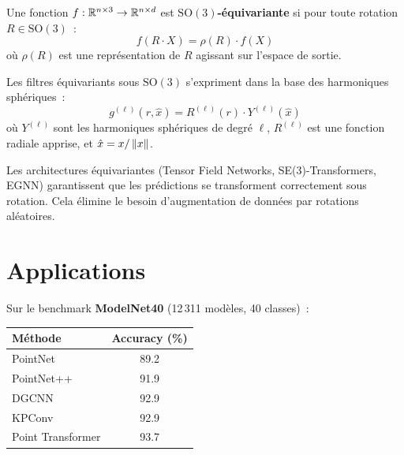 \begin{definition}
Une fonction $f : \mathbb{R}^{n \times 3} \to \mathbb{R}^{n \times d}$ est
\textbf{$\mathrm{SO}(3)$-\'equivariante} si pour toute rotation
$R \in \mathrm{SO}(3)$~:
\[
  f(R \cdot X) = \rho(R) \cdot f(X)
\]
o\`u $\rho(R)$ est une repr\'esentation de $R$ agissant sur l'espace
de sortie.
\end{definition}

\begin{theoreme}
Les filtres \'equivariants sous $\mathrm{SO}(3)$ s'expriment dans
la base des harmoniques sph\'eriques~:
\[
  g^{(\ell)}(r, \hat{x}) = R^{(\ell)}(r) \cdot Y^{(\ell)}(\hat{x})
\]
o\`u $Y^{(\ell)}$ sont les harmoniques sph\'eriques de degr\'e $\ell$,
$R^{(\ell)}$ est une fonction radiale apprise, et $\hat{x} = x / \left\| x \right\|$.
\end{theoreme}

\begin{remarque}
Les architectures \'equivariantes (Tensor Field Networks, SE(3)-Transformers,
EGNN) garantissent que les pr\'edictions se transforment correctement
sous rotation. Cela \'elimine le besoin d'augmentation de donn\'ees par
rotations al\'eatoires.
\end{remarque}

\section{Applications}
\label{sec:applications_pc}

\begin{exemple}
Sur le benchmark \textbf{ModelNet40} (12\,311 mod\`eles, 40 classes)~:
\begin{center}
\begin{tabular}{lc}
\toprule
\textbf{M\'ethode} & \textbf{Accuracy (\%)} \\
\midrule
PointNet & 89.2 \\
PointNet++ & 91.9 \\
DGCNN & 92.9 \\
KPConv & 92.9 \\
Point Transformer & 93.7 \\
\bottomrule
\end{tabular}
\end{center}
\end{exemple}

